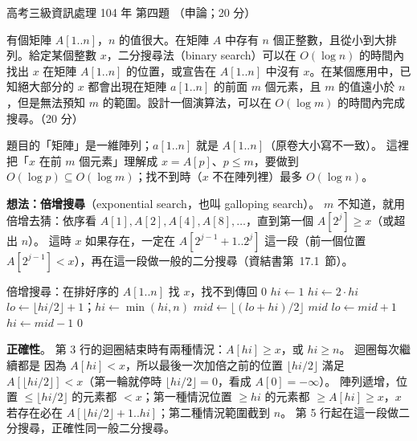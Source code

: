 \begin{pastexam}[label={px:gk3-104-ds-04}]{高考三級資訊處理 104 年 第四題}
（申論；20 分）

有個矩陣 $A[1..n]$，$n$ 的值很大。在矩陣 $A$ 中存有 $n$ 個正整數，且從小到大排列。給定某個整數 $x$，二分搜尋法（binary search）可以在 $O(\log n)$ 的時間內找出 $x$ 在矩陣 $A[1..n]$ 的位置，或宣告在 $A[1..n]$ 中沒有 $x$。在某個應用中，已知絕大部分的 $x$ 都會出現在矩陣 $a[1..n]$ 的前面 $m$ 個元素，且 $m$ 的值遠小於 $n$，但是無法預知 $m$ 的範圍。設計一個演算法，可以在 $O(\log m)$ 的時間內完成搜尋。（20 分）
\end{pastexam}

\begin{pastsoln}
題目的「矩陣」是一維陣列；$a[1..n]$ 就是 $A[1..n]$（原卷大小寫不一致）。 這裡把「$x$ 在前 $m$ 個元素」理解成
$x = A[p]$、$p \le m$，要做到 $O(\log p) \subseteq O(\log m)$；找不到時（$x$ 不在陣列裡）最多 $O(\log n)$。

\textbf{想法：倍增搜尋}（exponential search，也叫 galloping search）。 $m$ 不知道，就用倍增去猜：依序看
$A[1], A[2], A[4], A[8], \ldots$，直到第一個 $A[2^j] \ge x$（或超出 $n$）。 這時 $x$ 如果存在，一定在
$A[2^{j-1} + 1..2^j]$ 這一段（前一個位置 $A[2^{j-1}] < x$），再在這一段做一般的二分搜尋（資結書第~17.1~節）。
\begin{pseudo}[unbreakable]{倍增搜尋：在排好序的 $A[1..n]$ 找 $x$，找不到傳回 $0$}
    \State $\mathit{hi} \gets 1$
        \State $\mathit{hi} \gets 2 \cdot \mathit{hi}$ 
    \EndWhile
    \State $\mathit{lo} \gets \lfloor \mathit{hi} / 2 \rfloor + 1$；$\mathit{hi} \gets \min(\mathit{hi}, n)$
     
        \State $\mathit{mid} \gets \lfloor (\mathit{lo} + \mathit{hi}) / 2 \rfloor$
            \State \Return $\mathit{mid}$
            \State $\mathit{lo} \gets \mathit{mid} + 1$
        \Else
            \State $\mathit{hi} \gets \mathit{mid} - 1$
        \EndIf
    \EndWhile
    \State \Return $0$
\EndFunction
\end{pseudo}

\textbf{正確性}。 第 3 行的迴圈結束時有兩種情況：$A[\mathit{hi}] \ge x$，或 $\mathit{hi} \ge n$。 迴圈每次繼續都是
因為 $A[\mathit{hi}] < x$，所以最後一次加倍之前的位置 $\lfloor \mathit{hi}/2 \rfloor$ 滿足
$A[\lfloor \mathit{hi}/2 \rfloor] < x$（第一輪就停時 $\lfloor \mathit{hi}/2 \rfloor = 0$，看成 $A[0] = -\infty$）。
陣列遞增，位置 $\le \lfloor \mathit{hi}/2 \rfloor$ 的元素都 $< x$；第一種情況位置 $\ge \mathit{hi}$ 的元素都
$\ge A[\mathit{hi}] \ge x$，$x$ 若存在必在 $A[\lfloor\mathit{hi}/2\rfloor+1..\mathit{hi}]$；第二種情況範圍截到 $n$。
第 5 行起在這一段做二分搜尋，正確性同一般二分搜尋。


\end{pastsoln}
